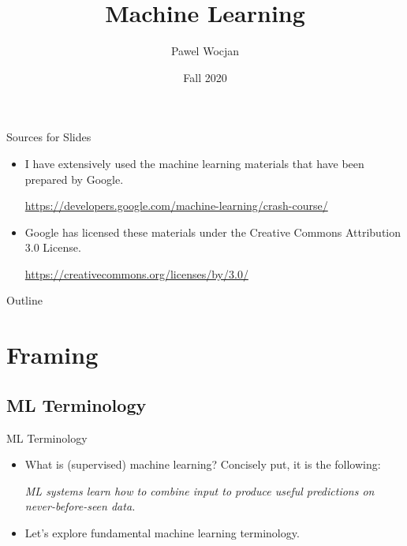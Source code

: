 \documentclass{beamer}
\title[ML]{Machine Learning}
\author{Pawel Wocjan}
\institute{University of Central Florida}
\date{Fall 2020}
\begin{document}
\begin{frame}
  \titlepage
\end{frame}

\begin{frame}{Sources for Slides}

\begin{itemize}
\item I have extensively used the machine learning materials that have been prepared by Google. 

\medskip
\footnotesize{ 
\url{https://developers.google.com/machine-learning/crash-course/}
}

\item Google has licensed these materials under the Creative Commons Attribution 3.0 License.

\medskip
\footnotesize{ 
\url{https://creativecommons.org/licenses/by/3.0/}
}
\end{itemize}
\end{frame}

\begin{frame}{Outline}
  \tableofcontents
\end{frame}

\section{Framing}

\subsection{ML Terminology}

\begin{frame}{ML Terminology}

\begin{itemize}
\item What is (supervised) machine learning? Concisely put, it is the following:

\medskip
\emph{ML systems learn how to combine input to produce useful predictions on never-before-seen data.}

\item Let's explore fundamental machine learning terminology.
\end{itemize}
\end{frame}

\end{document}
